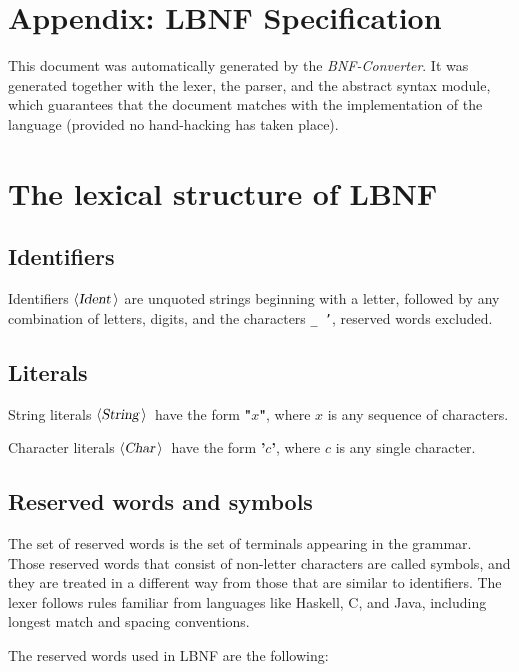 \documentclass[10pt]{article}
\newcommand{\terminal}[1]{\mbox{{\textbf {#1}}}}
\newcommand{\nonterminal}[1]{\mbox{$\langle \mbox{{\sl #1 }} \! \rangle$}}
\begin{document}




\small

\section{Appendix: LBNF Specification}

This document was automatically generated by the {\em BNF-Converter}. It was generated together with the lexer, the parser, and the abstract syntax module, which guarantees that the document matches with the implementation of the language (provided no hand-hacking has taken place).

\section*{The lexical structure of LBNF}
\subsection*{Identifiers}
Identifiers \nonterminal{Ident} are unquoted strings beginning with a letter,
followed by any combination of letters, digits, and the characters {\tt \_ '},
reserved words excluded.


\subsection*{Literals}
String literals \nonterminal{String}\ have the form
\terminal{"}$x$\terminal{"}, where $x$ is any sequence of characters.


Character literals \nonterminal{Char}\ have the form
\terminal{'}$c$\terminal{'}, where $c$ is any single character.

\subsection*{Reserved words and symbols}
The set of reserved words is the set of terminals appearing in the grammar. Those reserved words that consist of non-letter characters are called symbols, and they are
treated in a different way from those that are similar to identifiers. The lexer follows rules familiar from languages like Haskell, C, and Java, including longest match and spacing conventions.

The reserved words used in LBNF are the following: \\
\end{document}
